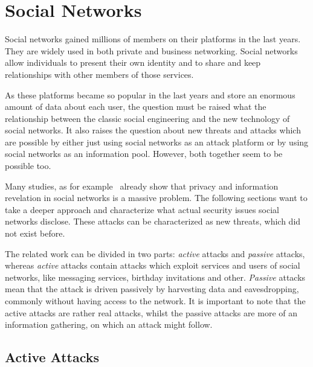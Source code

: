 \section{Social Networks}

Social networks gained millions of members on their platforms in the last years.
They are widely used in both private and business networking. Social networks
allow individuals to present their own identity and to share and keep
relationships with other members of those services.

As these platforms became so popular in the last years and store an enormous
amount of data about each user, the question must be raised what the
relationship between the classic social engineering and the new technology of
social networks. It also raises the question about new threats and attacks
which are possible by either just using social networks as an attack platform
or by using social networks as an information pool. However, both together
seem to be possible too.

Many studies, as for example~\cite{fraunhofer2008,gross2005} already show that privacy
and information revelation in social networks is a massive problem. The following
sections want to take a deeper approach and characterize what actual security
issues social networks disclose. These attacks can be characterized as new
threats, which did not exist before. 

The related work can be divided in two parts: \textit{active} attacks and
\textit{passive} attacks, whereas \textit{active} attacks contain attacks
which exploit services and users of social networks, like messaging services,
birthday invitations and other. \textit{Passive} attacks mean that the attack
is driven passively by harvesting data and eavesdropping, commonly without having
access to the network. It is important to note that the active attacks are
rather real attacks, whilst the passive attacks are more of an information
gathering, on which an attack might follow.

\subsection{Active Attacks}
\label{subsection:active_attacks}

